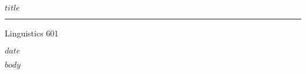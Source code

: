 \documentclass[11pt]{article}
\newcommand{\pdate}{$date$}
\newcommand{\pdate}{\today}
\newcommand{\passig}{$assignment$}
\newcommand{\passig}{hmm}
\newcommand{\ptitle}{$title$}
\newcommand{\ptitle}{Assignment \passig}
\newcommand{\0}{\rlap{\textsuperscript{$$ˆ{\circ}$$}}\xspace}
\renewcommand{\'}[1]{$$\overline{\text{#1}}$$}
\begin{document}
\thispagestyle{empty}


  \begin{flushleft}%
    {\large\sffamily \ptitle}%
  \end{flushleft} \vspace*{-20pt}
  \rule{\linewidth}{.5mm} \vspace*{-.32in}
  \begin{flushright}
    {\sffamily
       Linguistics 601 \par %
	\pdate}%
    \end{flushright}

$body$
\end{document}

